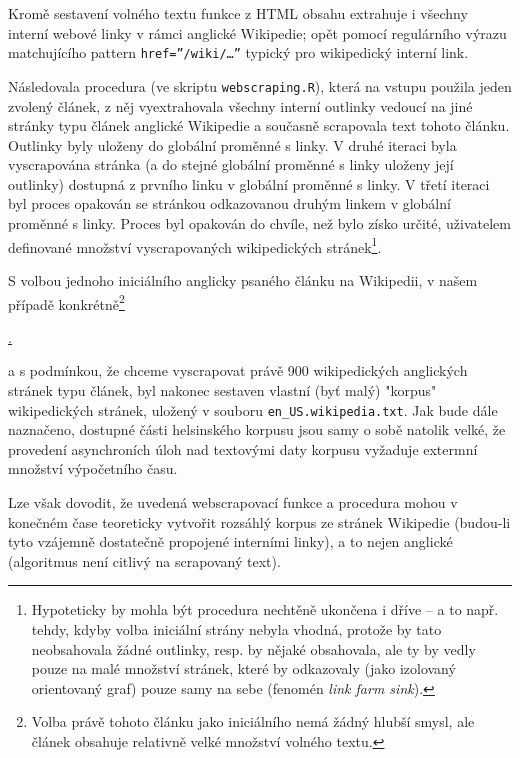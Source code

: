Kromě sestavení volného textu funkce z HTML obsahu extrahuje i všechny interní webové linky v rámci anglické Wikipedie; opět pomocí regulárního výrazu matchujícího pattern \texttt{href=''/wiki/\ldots''} typický pro wikipedický interní link.

Následovala procedura (ve skriptu \texttt{webscraping.R}), která na vstupu použila jeden zvolený článek, z něj vyextrahovala všechny interní outlinky vedoucí na jiné stránky typu článek anglické Wikipedie a současně scrapovala text tohoto článku. Outlinky byly uloženy do globální proměnné s linky. V druhé iteraci byla vyscrapována stránka (a do stejné globální proměnné s linky uloženy její outlinky) dostupná z prvního linku v globální proměnné s linky. V třetí iteraci byl proces opakován se stránkou odkazovanou druhým linkem v globální proměnné s linky. Proces byl opakován do chvíle, než bylo získo určité, uživatelem definované množství vyscrapovaných wikipedických stránek\footnote{Hypoteticky by mohla být procedura nechtěně ukončena i dříve -- a to např. tehdy, kdyby volba iniciální strány nebyla vhodná, protože by tato neobsahovala žádné outlinky, resp. by nějaké obsahovala, ale ty by vedly pouze na malé množství stránek, které by odkazovaly (jako izolovaný orientovaný graf) pouze samy na sebe (fenomén \textit{link farm sink}).}.

S volbou jednoho iniciálního anglicky psaného článku na Wikipedii, v našem případě konkrétně\footnote{Volba právě tohoto článku jako iniciálního nemá žádný hlubší smysl, ale článek obsahuje relativně velké množství volného textu.}

\begin{center}
\href{https://en.wikipedia.org/wiki/World\_War\_II}{.}
\end{center}

a s podmínkou, že chceme vyscrapovat právě 900 wikipedických anglických stránek typu článek, byl nakonec sestaven vlastní (byť malý) "korpus" wikipedických stránek, uložený v souboru \texttt{en\_US.wikipedia.txt}. Jak bude dále naznačeno, dostupné části helsinského korpusu jsou samy o sobě natolik velké, že provedení asynchroních úloh nad textovými daty korpusu vyžaduje extermní množství výpočetního času.

Lze však dovodit, že uvedená webscrapovací funkce a procedura mohou v konečném čase teoreticky vytvořit rozsáhlý korpus ze stránek Wikipedie (budou-li tyto vzájemně dostatečně propojené interními linky), a to nejen anglické (algoritmus není citlivý na scrapovaný text).



